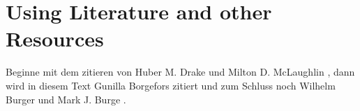 \chapter[Using Literature]{Using Literature and other Resources}
\label{cha:Literature}


\cite{Drake1948}	%

Beginne mit dem zitieren von Huber M. Drake und Milton D. McLaughlin \cite{horn1981determining}, dann wird in diesem Text Gunilla Borgefors zitiert \cite{borgefors1988hierarchical} und zum Schluss noch Wilhelm Burger und Mark J. Burge \cite{burger2016digital}.

